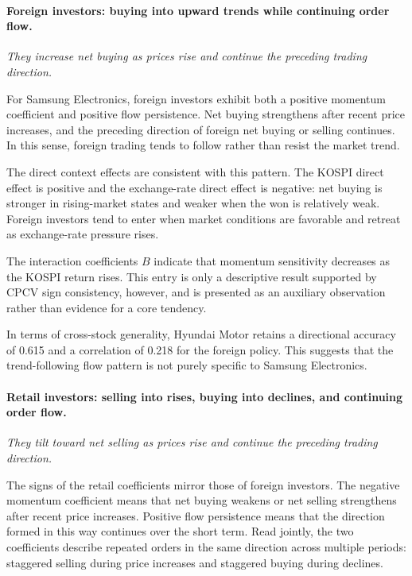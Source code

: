 \documentclass[sigconf,anonymous,review]{acmart}
\begin{document}
\paragraph{Foreign investors: buying into upward trends while continuing order flow.}
\emph{They increase net buying as prices rise and continue the preceding trading direction.}

For Samsung Electronics, foreign investors exhibit both a positive momentum coefficient and positive flow persistence. Net buying strengthens after recent price increases, and the preceding direction of foreign net buying or selling continues. In this sense, foreign trading tends to follow rather than resist the market trend.

The direct context effects are consistent with this pattern. The KOSPI direct effect is positive and the exchange-rate direct effect is negative: net buying is stronger in rising-market states and weaker when the won is relatively weak. Foreign investors tend to enter when market conditions are favorable and retreat as exchange-rate pressure rises.

The interaction coefficients $B$ indicate that momentum sensitivity decreases as the KOSPI return rises. This entry is only a descriptive result supported by CPCV sign consistency, however, and is presented as an auxiliary observation rather than evidence for a core tendency.

In terms of cross-stock generality, Hyundai Motor retains a directional accuracy of 0.615 and a correlation of 0.218 for the foreign policy. This suggests that the trend-following flow pattern is not purely specific to Samsung Electronics.

\paragraph{Retail investors: selling into rises, buying into declines, and continuing order flow.}
\emph{They tilt toward net selling as prices rise and continue the preceding trading direction.}

The signs of the retail coefficients mirror those of foreign investors. The negative momentum coefficient means that net buying weakens or net selling strengthens after recent price increases. Positive flow persistence means that the direction formed in this way continues over the short term. Read jointly, the two coefficients describe repeated orders in the same direction across multiple periods: staggered selling during price increases and staggered buying during declines.
\end{document}
